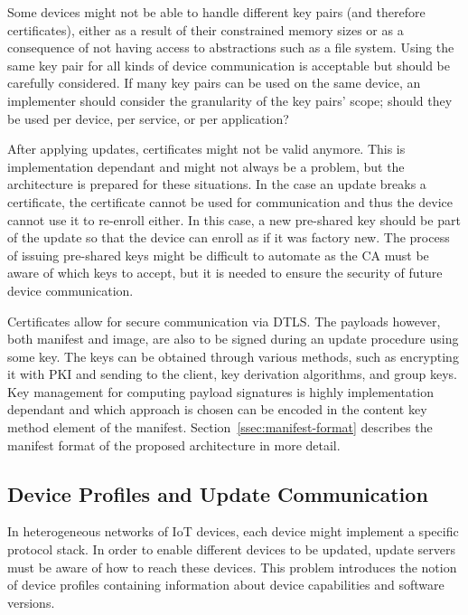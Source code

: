 \documentclass[0-thesis.tex]{subfiles}
\begin{document}
Some devices might not be able to handle different key pairs (and therefore certificates),
either as a result of their constrained memory sizes or as a consequence of not having
access to abstractions such as a file system. Using the same key pair for all kinds of
device communication is acceptable but should be carefully considered. If many key pairs
can be used on the same device, an implementer should consider the granularity of the key
pairs' scope; should they be used per device, per service, or per application?

After applying updates, certificates might not be valid anymore. This is implementation
dependant and might not always be a problem, but the architecture is prepared for these
situations. In the case an update breaks a certificate, the certificate cannot be used for
communication and thus the device cannot use it to re-enroll either. In this case, a new
pre-shared key should be part of the update so that the device can enroll as if it was
factory new. The process of issuing pre-shared keys might be difficult to automate as the
CA must be aware of which keys to accept, but it is needed to ensure the security of
future device communication.

Certificates allow for secure communication via DTLS. The payloads however, both manifest
and image, are also to be signed during an update procedure using some key. The keys can
be obtained through various methods, such as encrypting it with PKI and sending to the
client, key derivation algorithms, and group keys. Key management for computing payload
signatures is highly implementation dependant and which approach is chosen can be encoded
in the content key method element of the manifest. Section~\ref{ssec:manifest-format}
describes the manifest format of the proposed architecture in more detail.

\subsection{Device Profiles and Update Communication}
\label{ssec:communication}
In heterogeneous networks of IoT devices, each device might implement a specific protocol
stack. In order to enable different devices to be updated, update servers must be aware of
how to reach these devices. This problem introduces the notion of device profiles
containing information about device capabilities and software versions. 
\end{document}
